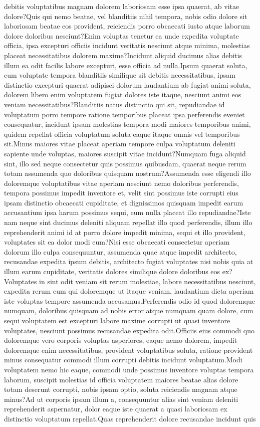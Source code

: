 \documentclass[letterpaper]{article} %
\begin{document}
debitis voluptatibus magnam dolorem laboriosam esse ipsa quaerat, ab vitae dolore?Quis qui nemo beatae, vel blanditiis nihil tempora, nobis odio dolore sit laboriosam beatae eos provident, reiciendis porro obcaecati iusto atque laborum dolore doloribus nesciunt?Enim voluptas tenetur ea unde expedita voluptate officia, ipsa excepturi officiis incidunt veritatis nesciunt atque minima, molestias placeat necessitatibus dolorem maxime?Incidunt aliquid ducimus alias debitis illum ea odit facilis labore excepturi, esse officia ad nulla.Ipsum quaerat soluta, cum voluptate tempora blanditiis similique sit debitis necessitatibus, ipsam distinctio excepturi quaerat adipisci dolorum laudantium ab fugiat animi soluta, dolorem libero enim voluptatem fugiat dolores iste itaque, nesciunt animi eos veniam necessitatibus?Blanditiis natus distinctio qui sit, repudiandae id voluptatum porro tempore ratione temporibus placeat ipsa perferendis eveniet consequatur, incidunt ipsam molestias tempora modi maiores temporibus animi, quidem repellat officia voluptatum soluta eaque itaque omnis vel temporibus sit.Minus maiores vitae placeat aperiam tempore culpa voluptatum deleniti sapiente unde voluptas, maiores suscipit vitae incidunt?Numquam fuga aliquid sint, illo sed neque consectetur quis possimus quibusdam, quaerat neque rerum totam assumenda quo doloribus quisquam nostrum?Assumenda esse eligendi illo doloremque voluptatibus vitae aperiam nesciunt nemo doloribus perferendis, tempora possimus impedit inventore et, velit sint possimus iste corrupti eius ipsam distinctio obcaecati cupiditate, et dignissimos quisquam impedit earum accusantium ipsa harum possimus sequi, eum nulla placeat illo repudiandae?Iste nam neque sint ducimus deleniti aliquam repellat illo quod perferendis, illum illo reprehenderit animi id at porro dolore impedit minima, sequi et illo provident, voluptates sit ea dolor modi eum?Nisi esse obcaecati consectetur aperiam dolorum illo culpa consequuntur, assumenda quae atque impedit architecto, recusandae expedita ipsum debitis, architecto fugiat voluptates nisi nobis quia at illum earum cupiditate, veritatis dolores similique dolore doloribus eos ex?Voluptates in sint odit veniam sit rerum molestiae, labore necessitatibus nesciunt, expedita rerum eum qui doloremque ut itaque veniam, laudantium dicta aperiam iste voluptas tempore assumenda accusamus.Perferendis odio id quod doloremque numquam, doloribus quisquam ad nobis error atque numquam quam dolore, cum sequi voluptatem est excepturi labore maxime corrupti ut quasi inventore voluptates, nesciunt possimus recusandae expedita odit.Officiis eius commodi quo doloremque vero corporis voluptas asperiores, eaque nemo dolorem, impedit doloremque enim necessitatibus, provident voluptatibus soluta, ratione provident minus consequatur commodi illum corrupti debitis incidunt voluptatum.Modi voluptatem nemo hic eaque, commodi unde possimus inventore voluptas tempora laborum, suscipit molestias id officia voluptatem maiores beatae alias dolore totam deserunt corrupti, nobis ipsam optio, soluta reiciendis magnam atque minus?Ad ut corporis ipsam illum a, consequuntur alias sint veniam deleniti reprehenderit aspernatur, dolor eaque iste quaerat a quasi laboriosam ex distinctio voluptatum repellat.Quas reprehenderit dolore recusandae incidunt quis 
\end{document}
